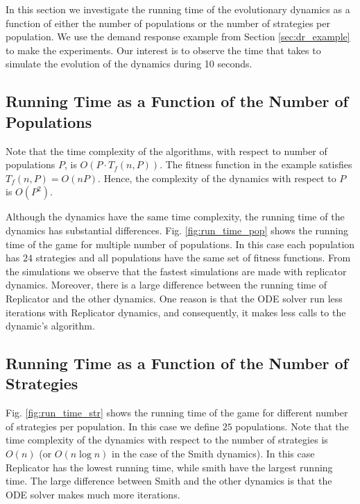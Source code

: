 \documentclass[a4paper,10pt]{article}
\begin{document}
In this section we investigate the running time of the evolutionary dynamics as a function of either the number of populations or the number of strategies per population. We use the demand response example from Section \ref{sec:dr_example} to make the experiments.
Our interest is to observe the time that takes to simulate the evolution of the dynamics during 10 seconds.

\subsection{Running Time as a Function of the Number of Populations}

Note that the time complexity of the algorithms, with respect to number of populations $P$, is $O(P \cdot T_f(n,P))$. The fitness function in the example satisfies $T_f(n,P)=O(nP)$. Hence, the complexity of the dynamics with respect to $P$ is $O(P^2)$. 

Although the dynamics have the same time complexity, the running time of the dynamics has substantial differences. 
Fig. \ref{fig:run_time_pop} shows the running time of the game for multiple number of populations. In this case each population has $24$ strategies and all populations have the same set of fitness functions. 
From the simulations we observe that the 
fastest simulations are made with replicator dynamics. 
Moreover, there is a large difference between the running time of Replicator and the other dynamics.
%
One reason is that the ODE solver run less iterations with Replicator dynamics, and consequently, it makes less calls to the dynamic's algorithm. 



\subsection{Running Time as a Function of the Number of Strategies}


Fig. \ref{fig:run_time_str} shows the running time of the game for different number of strategies per population. In this case we  define $25$ populations. Note that the time complexity of the dynamics with respect to the number of strategies is $O(n)$ (or $O(n \log n)$ in the case of the Smith dynamics). In this case Replicator has the lowest running time, while smith have the largest running time. The large difference between Smith and the other dynamics is that the ODE solver makes much more iterations.
\end{document}
